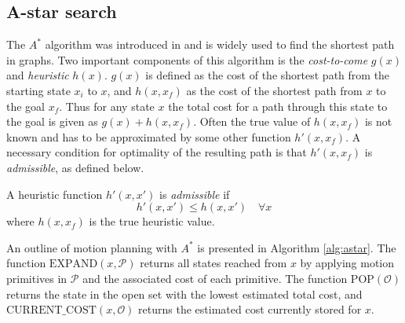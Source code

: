 \subsection{A-star search}\label{sec:a-star}
The $A^*$ algorithm was introduced in \cite{astar} and is widely used to find the shortest path in graphs.
Two important components of this algorithm is the \textit{cost-to-come} $g(x)$ and \textit{heuristic} $h(x)$. $g(x)$ is defined as 
the cost of the shortest path from the starting state $x_i$ to $x$, and $h(x, x_f)$ as the cost of the shortest path from $x$ to the goal $x_f$.
Thus for any state $x$ the total cost for a path through this state to the goal is given as $g(x)+h(x,x_f)$.
Often the true value of $h(x, x_f)$ is not known and has to be approximated by some other function $h'(x, x_f)$. A necessary 
condition for optimality of the resulting path is that $h'(x, x_f)$ is \textit{admissible}, as defined below.

\begin{definition}
    A heuristic function $h'(x, x')$ is \textit{admissible} if
    \begin{equation}
        h'(x, x')\leq h(x, x') \quad\forall x
    \end{equation}
    where $h(x, x_f)$ is the true heuristic value.    
\end{definition}

An outline of motion planning with $A^*$ is presented in Algorithm \ref{alg:astar}.
The function $\text{EXPAND}(x, \mathcal{P})$ returns all states reached from $x$ by applying motion primitives in $\mathcal{P}$ and the associated cost of each primitive. The function $\text{POP}(\mathcal{O})$ returns the state in
the open set with the lowest estimated total cost, 
and \\$\text{CURRENT\_COST}(x,\mathcal{O})$  returns the estimated cost currently stored for $x$. 


